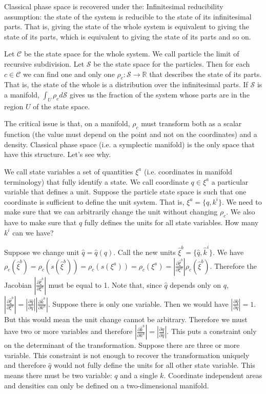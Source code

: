 \documentclass[letterpaper]{article}
\begin{document}
Classical phase space is recovered under the:
Infinitesimal reducibility assumption: the state of the system is reducible to the state of its infinitesimal parts. That is, giving the state of the whole system is equivalent to giving the state of its parts, which is equivalent to giving the state of its parts and so on.

Let $\mathcal{C}$ be the state space for the whole system. We call particle the limit of recursive subdivision. Let $\mathcal{S}$ be the state space for the particles. Then for each $c \in \mathcal{C}$ we can find one and only one $\rho_c : \mathcal{S} \to \mathbb{R} $ that describes the state of its parts. That is, the state of the whole is a distribution over the infinitesimal parts. If $\mathcal{S}$ is a manifold, $\int_U \rho_c d\mathcal{S}$ gives us the fraction of the system whose parts are in the region $U$ of the state space.

The critical issue is that, on a manifold, $\rho_c$ must transform both as a scalar function (the value must depend on the point and not on the coordinates) and a density. Classical phase space (i.e. a symplectic manifold) is the only space that have this structure. Let's see why.

We call state variables a set of quantities $\xi^a$ (i.e. coordinates in manifold terminology) that fully identify a state. We call coordinate $q \in \xi^a$ a particular variable that defines a unit. Suppose the particle state space is such that one coordinate is sufficient to define the unit system. That is, $\xi^a = \{ q, k^i \}$. We need to make sure that we can arbitrarily change the unit without changing $\rho_c$. We also have to make sure that $q$ fully defines the units for all state variables. How many $k^i$ can we have?

Suppose we change unit $\hat{q}=\hat{q}(q)$. Call the new units $\hat{\xi}^b = \{ \hat{q}, \hat{k}^i\}$. We have $\rho_c(\hat{\xi}^b)=\rho_c(s(\hat{\xi}^b))=\rho_c(s(\xi^a))=\rho_c(\xi^a) = \left|\frac{\partial \hat{\xi}^b}{\partial \xi^a} \right| \rho_c(\hat\xi^b)$. Therefore the Jacobian $\left|\frac{\partial \hat{\xi}^b}{\partial \xi^a} \right|$ must be equal to 1. Note that, since $\hat{q}$ depends only on $q$, $\left|\frac{\partial \hat{\xi}^b}{\partial \xi^a} \right| = \left|\frac{\partial \hat q}{\partial q} \right|\left|\frac{\partial \hat{k}^b}{\partial k^a} \right|$. Suppose there is only one variable. Then we would have $\left|\frac{\partial \hat q}{\partial q} \right| = 1$. But this would mean the unit change cannot be arbitrary. Therefore we must have two or more variables and therefore $\left|\frac{\partial \hat{k}^b}{\partial k^a} \right| = \left|\frac{\partial q}{\partial \hat q} \right|$. This puts a constraint only on the determinant of the transformation. Suppose there are three or more variable. This constraint is not enough to recover the transformation uniquely and therefore $\hat q$  would not fully define the units for all other state variable. This means there must be two variable: $q$ and a single $k$. Coordinate independent areas and densities can only be defined on a two-dimensional manifold.
\end{document}
